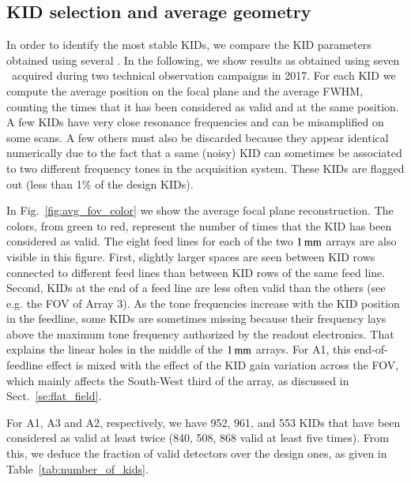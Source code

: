 \subsection{KID selection and average geometry}
\label{se:avg_kidpar}

In order to identify the most stable KIDs, we compare the KID parameters
obtained using several \bms.  In the following, we show results as
obtained using seven \bms\ acquired during two technical observation
campaigns in 2017.
For each KID we
compute the average position on the focal plane and the average FWHM, counting
the times that it has been considered as valid and at the same position. 
A few KIDs have very close resonance frequencies and can be misamplified on some scans. A
few others must also be discarded because they appear identical numerically due
to the fact that a same (noisy) KID can sometimes be associated
to two different frequency tones in the acquisition system.
These KIDs are flagged out (less than 1\% of the design KIDs).

In Fig.~\ref{fig:avg_fov_color} we show the
average focal plane reconstruction. The colors, from green to red,
represent the number of times that the KID has been considered as valid.
The eight feed lines for each of the two
$1\,\rm{mm}$ arrays are also visible in this figure. First, slightly
larger spaces are seen between KID rows connected to different
feed lines than between KID rows of the same feed line. Second,
KIDs at the end of a feed line are less often valid than the others
(see e.g. the FOV of Array 3). As the tone frequencies
increase with the KID position in the feedline, some KIDs are
sometimes missing because their frequency lays above the maximum tone
frequency authorized by the readout electronics. That explains the linear holes
in the middle of the $1\,\rm{mm}$ arrays. For A1, this end-of-feedline
effect is mixed with the effect of the KID gain variation across the
FOV, which mainly affects the South-West third of the array, as
discussed in Sect.~\ref{se:flat_field}.


For A1, A3 and A2, respectively, we have 952, 961, and 553 KIDs that
have been considered as valid at least twice (840, 508, 868 valid at
least five times). From this, we deduce the fraction of
valid detectors over the design ones, as given in Table~\ref{tab:number_of_kids}.


